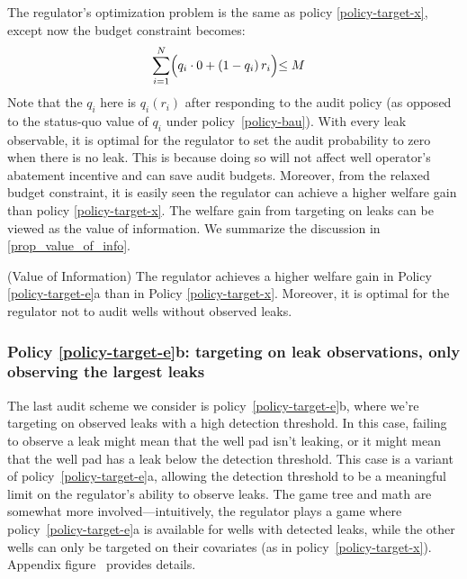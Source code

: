 The regulator's optimization problem is the same as policy \ref{policy-target-x}, except now the budget constraint becomes:
\begin{align*}
&\sum^{N}_{i=1} \Bigl( q_i \cdot 0 + (1 - q_i)\, r_i \Bigl) \leq M
\end{align*}
Note that the \(q_i\) here is \(q_i(r_i)\) after responding to the audit policy (as opposed to the status-quo value of \(q_i\) under policy~\ref{policy-bau}).
With every leak observable, it is optimal for the regulator to set the audit probability to zero when there is no leak.
This is because doing so will not affect well operator's abatement incentive and can save audit budgets.
Moreover, from the relaxed budget constraint, it is easily seen the regulator can achieve a higher welfare gain than policy \ref{policy-target-x}.
The welfare gain from targeting on leaks can be viewed as the value of information.
We summarize the discussion in \autoref{prop_value_of_info}.

\begin{proposition}{(Value of Information)} \label{prop_value_of_info}
    The regulator achieves a higher welfare gain in Policy \ref{policy-target-e}a than in Policy \ref{policy-target-x}.
    Moreover, it is optimal for the regulator not to audit wells without observed leaks.
\end{proposition}

\subsubsection{Policy \ref{policy-target-e}b: targeting on leak observations, only observing the largest leaks}

The last audit scheme we consider is policy~\ref{policy-target-e}b, where we're targeting on observed leaks with a high detection threshold.
In this case, failing to observe a leak might mean that the well pad isn't leaking, or it might mean that the well pad has a leak below the detection threshold.
This case is a variant of policy~\ref{policy-target-e}a, allowing the detection threshold to be a meaningful limit on the regulator's ability to observe leaks.
The game tree and math are somewhat more involved---intuitively, the regulator plays a game where policy~\ref{policy-target-e}a is available for wells with detected leaks, while the other wells can only be targeted on their covariates (as in policy~\ref{policy-target-x}).
Appendix figure~\iftoggle{usexr}{\ref{fig:game-tree-target-e-censor}}{A3} provides details.


